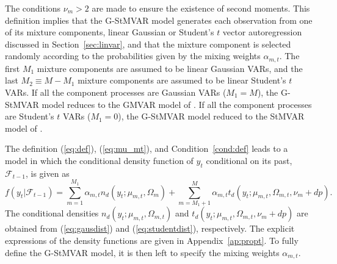\documentclass[nojss]{jss} %
\begin{document}
The conditions $\nu_m>2$ are made to ensure the existence of second moments.  This definition implies that the G-StMVAR model generates each observation from one of its mixture components, linear Gaussian or Student's $t$ vector autoregression discussed in Section~\ref{sec:linvar}, and that the mixture component is selected randomly according to the probabilities given by the mixing weights $\alpha_{m,t}$. The first $M_1$ mixture components are assumed to be linear Gaussian VARs,  and the last $M_2\equiv M - M_1$ mixture components are assumed to be linear Student's $t$ VARs.  If all the component processes are Gaussian VARs ($M_1=M$),  the G-StMVAR model reduces to the GMVAR model of \cite{Kalliovirta+Meitz+Saikkonen:2016}.  If all the component processes are Student's $t$ VARs ($M_1=0$), the G-StMVAR model reduced to the StMVAR model of \cite{Virolainen2:2021}. %

The definition (\ref{eq:def}),  (\ref{eq:mu_mt}), and Condition~\ref{cond:def} leads to a model in which the conditional density function of $y_t$ conditional on its past, $\mathcal{F}_{t-1}$,  is given as
\begin{equation}\label{eq:conddist}
f(y_t|\mathcal{F}_{t-1}) = \sum_{m=1}^{M_1}\alpha_{m,t}n_d(y_t;\mu_{m,t},\Omega_{m}) +  \sum_{m=M_1+1}^M\alpha_{m,t}t_d(y_t;\mu_{m,t},\Omega_{m,t},\nu_m+dp).
\end{equation}
The conditional densities $n_d(y_t;\mu_{m,t},\Omega_{m,t})$ and $t_d(y_t;\mu_{m,t},\Omega_{m,t},\nu_m+dp)$ are obtained from (\ref{eq:gausdist}) and (\ref{eq:studentdist}), respectively. The explicit expressions of the density functions are given in Appendix~\ref{ap:propt}. To fully define the G-StMVAR model, it is then left to specify the mixing weights $\alpha_{m,t}$.
\end{document}

